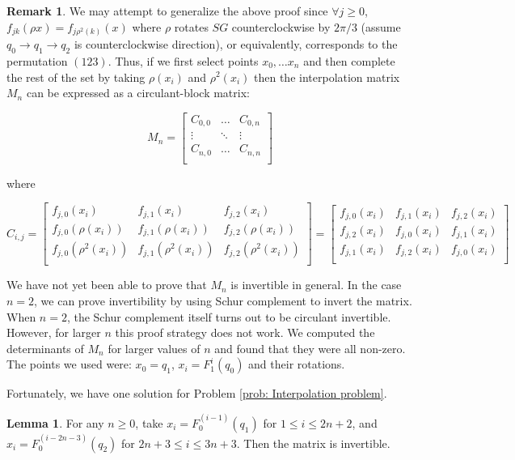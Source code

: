 \documentclass[12pt]{amsart}
\makeatletter
\renewcommand*{\eqref}[1]{%
  \hyperref[{#1}]{\textup{\tagform@{\ref*{#1}}}}%
}
\theoremstyle{plain}
\theoremstyle{definition}
\newtheorem{lemma}{Lemma}[section]
\newtheorem{remark}{Remark}[section]
\makeatother
\begin{document}
\begin{remark}\label{rem:circulant}
We may attempt to generalize the above proof since $\forall j \geq 0$, $f_{jk}(\rho x) = f_{j\rho^2(k)}(x)$ where $\rho$ rotates $SG$ counterclockwise by $2\pi/3$ (assume $q_0\rightarrow q_1\rightarrow q_2$ is counterclockwise direction), or equivalently, corresponds to the permutation $(1 2 3)$. Thus, if we first select points $x_0, \ldots x_{n}$ and then complete the rest of the set by taking $\rho(x_i)$ and $\rho^2(x_i)$ then the interpolation matrix $M_n$ can be expressed as a circulant-block matrix: 

$$ M_n = \begin{bmatrix}
C_{0,0} & \hdots & C_{0,n} \\
\vdots & \ddots & \vdots \\
C_{n,0} & \hdots & C_{n,n}\\
\end{bmatrix}$$

where 

$$C_{i,j} = \begin{bmatrix}
f_{j,0}(x_i) & f_{j,1}(x_i) & f_{j,2}(x_i)\\
f_{j,0}(\rho(x_i)) & f_{j,1}(\rho(x_i)) & f_{j,2}(\rho(x_i))\\
f_{j,0}(\rho^2(x_i)) & f_{j,1}(\rho^2(x_i)) & f_{j,2}(\rho^2(x_i))\\
\end{bmatrix} = \begin{bmatrix}
f_{j,0}(x_i) & f_{j,1}(x_i) & f_{j,2}(x_i)\\
f_{j,2}(x_i) & f_{j,0}(x_i) & f_{j,1}(x_i)\\
f_{j,1}(x_i) & f_{j,2}(x_i) & f_{j,0}(x_i)\\
\end{bmatrix} $$

We have not yet been able to prove that $M_n$ is invertible in general. In the case $n=2$, we can prove invertibility by using Schur complement to invert the matrix. When $n=2$, the Schur complement itself turns out to be circulant invertible. However, for larger $n$ this proof strategy does not work. We computed the determinants of $M_n$ for larger values of $n$ and found that they were all non-zero. The points we used were: $x_0 = q_1$, $x_i = F^{i}_{1}(q_0)$ and their rotations. 
\end{remark}
Fortunately, we have one solution for Problem \ref{prob: Interpolation problem}.
\begin{lemma}\label{lemma:solinterpolation}
For any $n\ge 0$, take $x_i=F_0^{(i-1)}(q_1)$ for $1\le i\le 2n+2$, and $x_i=F_0^{(i-2n-3)}(q_2)$ for $2n+3\le i \le 3n+3$. Then the matrix \eqref{interpolationmatrix} is invertible.
\end{lemma}
\end{document}
